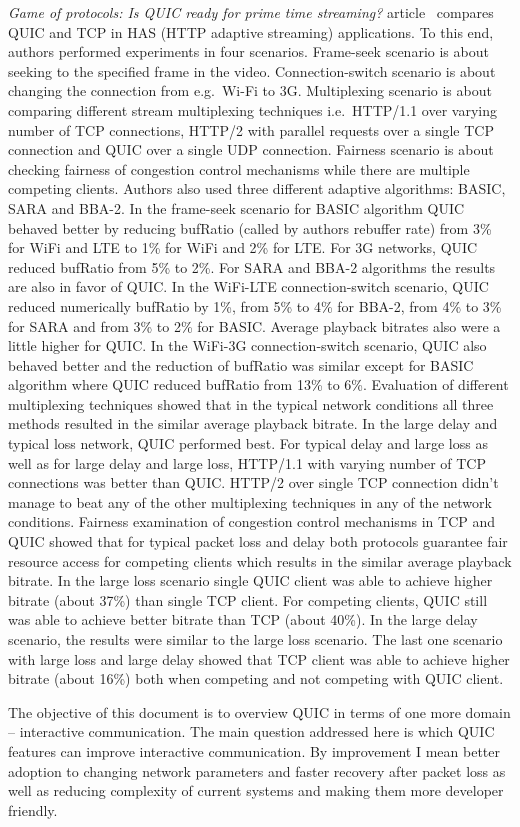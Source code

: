 \textit{Game of protocols: Is QUIC ready for prime time streaming?} article~\cite{game-of-protocols} compares QUIC and TCP in HAS (HTTP adaptive streaming) applications.
To this end, authors performed experiments in four scenarios.
Frame-seek scenario is about seeking to the specified frame in the video.
Connection-switch scenario is about changing the connection from e.g.\ Wi-Fi to 3G\@.
Multiplexing scenario is about comparing different stream multiplexing techniques i.e.\ HTTP/1.1 over varying number of TCP connections, HTTP/2 with parallel requests over a single TCP connection and QUIC over a single UDP connection.
Fairness scenario is about checking fairness of congestion control mechanisms while there are multiple competing clients.
Authors also used three different adaptive algorithms: BASIC, SARA and BBA-2.
In the frame-seek scenario for BASIC algorithm QUIC behaved better by reducing bufRatio (called by authors rebuffer rate) from 3\% for WiFi and LTE to 1\% for WiFi and 2\% for LTE\@.
For 3G networks, QUIC reduced bufRatio from 5\% to 2\%.
For SARA and BBA-2 algorithms the results are also in favor of QUIC\@.
In the WiFi-LTE connection-switch scenario, QUIC reduced numerically bufRatio by 1\%, from 5\% to 4\% for BBA-2, from 4\% to 3\% for SARA and from 3\% to 2\% for BASIC\@.
Average playback bitrates also were a little higher for QUIC\@.
In the WiFi-3G connection-switch scenario, QUIC also behaved better and the reduction of bufRatio was similar except for BASIC algorithm where QUIC reduced bufRatio from 13\% to 6\%.
Evaluation of different multiplexing techniques showed that in the typical network conditions all three methods resulted in the similar average playback bitrate.
In the large delay and typical loss network, QUIC performed best.
For typical delay and large loss as well as for large delay and large loss, HTTP/1.1 with varying number of TCP connections was better than QUIC\@.
HTTP/2 over single TCP connection didn't manage to beat any of the other multiplexing techniques in any of the network conditions.
Fairness examination of congestion control mechanisms in TCP and QUIC showed that for typical packet loss and delay both protocols guarantee fair resource access for competing clients which results in the similar average playback bitrate.
In the large loss scenario single QUIC client was able to achieve higher bitrate (about 37\%) than single TCP client.
For competing clients, QUIC still was able to achieve better bitrate than TCP (about 40\%).
In the large delay scenario, the results were similar to the large loss scenario.
The last one scenario with large loss and large delay showed that TCP client was able to achieve higher bitrate (about 16\%) both when competing and not competing with QUIC client.

The objective of this document is to overview QUIC in terms of one more domain -- interactive communication.
The main question addressed here is which QUIC features can improve interactive communication.
By improvement I mean better adoption to changing network parameters and faster recovery after packet loss as well as reducing complexity of current systems and making them more developer friendly.
